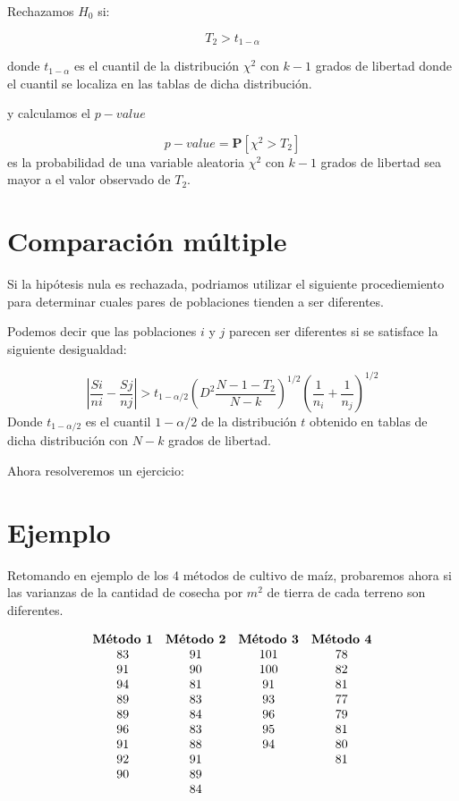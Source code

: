 \documentclass[
  a4paper,
  oneside,
  openany]{book}
\begin{document}
Rechazamos \(H_0\) si:

\[T_{2}>t_{1-\alpha}\]

donde \(t_{1-\alpha}\) es el cuantil de la distribución \(\chi^2\) con \(k-1\) grados de libertad donde el cuantil se localiza en las tablas de dicha distribución.

y calculamos el \(p-value\)

\[p-value= \mathbf{P}\left[\chi^2>T_{2}\right]\]
es la probabilidad de una variable aleatoria \(\chi^2\) con \(k-1\) grados de libertad sea mayor a el valor observado de \(T_2\).

\hypertarget{comparaciuxf3n-muxfaltiple}{%
\section{Comparación múltiple}\label{comparaciuxf3n-muxfaltiple}}

Si la hipótesis nula es rechazada, podriamos utilizar el siguiente procediemiento para determinar cuales pares de poblaciones tienden a ser diferentes.

Podemos decir que las poblaciones \(i\) y \(j\) parecen ser diferentes si se satisface la siguiente desigualdad:

\[\left|\frac{Si}{ni}- \frac{Sj}{nj}\right|> t_{1-\alpha/2}\left(D^2\frac{N-1-T_{2}}{N-k}\right)^{1/2}\left(\frac{1}{n_i}+\frac{1}{n_j}\right)^{1/2}\]
Donde \(t_{1-\alpha/2}\) es el cuantil \(1-\alpha/2\) de la distribución \(t\) obtenido en tablas de dicha distribución con \(N-k\) grados de libertad.

Ahora resolveremos un ejercicio:

\hypertarget{ejemplo-9}{%
\section{Ejemplo}\label{ejemplo-9}}

Retomando en ejemplo de los 4 métodos de cultivo de maíz, probaremos ahora si las varianzas de la cantidad de cosecha por \(m^2\) de tierra de cada terreno son diferentes.

\[
\begin{array}{c c c c} 
\textbf{Método 1} & \textbf{Método 2} & \textbf{Método 3} & \textbf{Método 4}\\
83&91&101&78\\
91&90&100&82\\
94&81&91&81\\
89&83&93&77\\
89&84&96&79\\
96&83&95&81\\
91&88&94&80\\
92&91&  &81\\
90&89&  &\\
  &84&  &\\
\end{array}
\]
\end{document}
